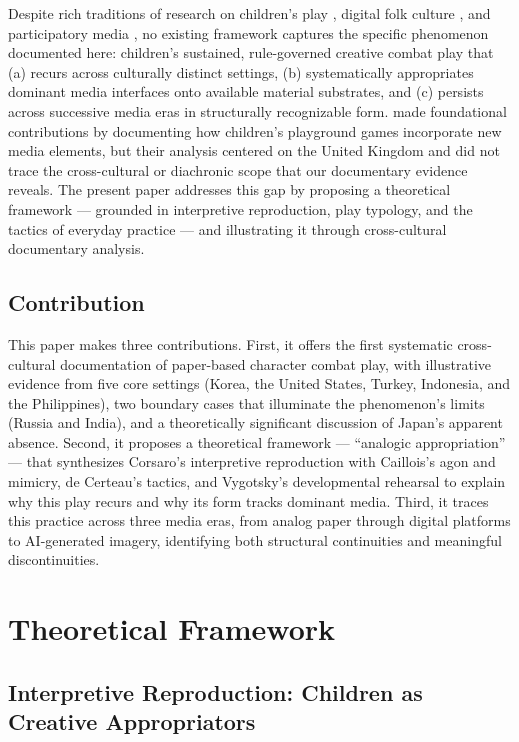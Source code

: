 \documentclass[12pt]{article}
\begin{document}
Despite rich traditions of research on children's play \citep{opie1969,edwards2000,burn2014}, digital folk culture \citep{blank2012,owens2025}, and participatory media \citep{jenkins2006,ito2010}, no existing framework captures the specific phenomenon documented here: children's sustained, rule-governed creative combat play that (a) recurs across culturally distinct settings, (b) systematically appropriates dominant media interfaces onto available material substrates, and (c) persists across successive media eras in structurally recognizable form. \citet{burn2014} made foundational contributions by documenting how children's playground games incorporate new media elements, but their analysis centered on the United Kingdom and did not trace the cross-cultural or diachronic scope that our documentary evidence reveals. The present paper addresses this gap by proposing a theoretical framework --- grounded in interpretive reproduction, play typology, and the tactics of everyday practice --- and illustrating it through cross-cultural documentary analysis.

\subsection{Contribution}

This paper makes three contributions. First, it offers the first systematic cross-cultural documentation of paper-based character combat play, with illustrative evidence from five core settings (Korea, the United States, Turkey, Indonesia, and the Philippines), two boundary cases that illuminate the phenomenon's limits (Russia and India), and a theoretically significant discussion of Japan's apparent absence. Second, it proposes a theoretical framework --- ``analogic appropriation'' --- that synthesizes Corsaro's interpretive reproduction with Caillois's agon and mimicry, de Certeau's tactics, and Vygotsky's developmental rehearsal to explain why this play recurs and why its form tracks dominant media. Third, it traces this practice across three media eras, from analog paper through digital platforms to AI-generated imagery, identifying both structural continuities and meaningful discontinuities.

\section{Theoretical Framework}

\subsection{Interpretive Reproduction: Children as Creative Appropriators}
\end{document}
